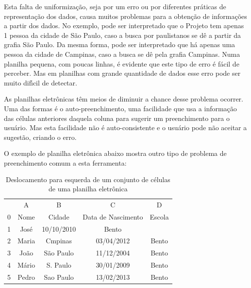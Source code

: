 \documentclass[
12pt,		%
openright,	%
twoside,  %
a4paper,			%
chapter=TITLE,		%
english,			%
french,				%
spanish,			%
brazil				%
]{USPSC-classe/USPSC}
\begin{document}
Esta falta de uniformiza\c{c}\~ao, seja por um erro ou por diferentes pr\'aticas de representa\c{c}\~ao dos dados, causa muitos problemas para a obten\c{c}\~ao de informa\c{c}\~oes a partir dos dados. No exemplo, pode ser interpretado que o Projeto tem apenas 1 pessoa da cidade de S\~ao Paulo, caso a busca por paulistanos se d\^e a partir da grafia \textquotedbl S\~ao Paulo\textquotedbl . Da mesma forma, pode ser interpretado que h\'a apenas uma pessoa da cidade de Campinas, caso a busca se d\^e pela grafia \textquotedbl Campinas\textquotedbl . Numa planilha pequena, com poucas linhas, \'e evidente que este tipo de erro \'e f\'acil de perceber. Mas em planilhas com grande quantidade de dados esse erro pode ser muito dif\'{\i}cil de detectar.














As planilhas eletr\^onicas t\^em meios de diminuir a chance desse problema ocorrer. Uma das formas \'e o auto-preenchimento, uma facilidade que usa a informa\c{c}\~ao das c\'elulas anteriores daquela coluna para sugerir um preenchimento para o usu\'ario. Mas esta facilidade n\~ao \'e auto-consistente e o usu\'ario pode n\~ao aceitar a sugest\~ao, criando o erro.














O exemplo de planilha eletr\^onica abaixo mostra outro tipo de problema de preenchimento comum a esta ferramenta:


















\begin{table}[htb]
\tiny
\caption{\label{f6feaa39313aa0691b7fdadc84175a203e68bf77}Deslocamento para esquerda de um conjunto de c\'elulas de uma planilha eletr\^onica}

\centering
\begin{tabular}{|c|c|c|c|c|}
\hline
  &  A  &  B  &  C  &  D  \\
0 & Nome  &  Cidade  &  Data de Nascimento  &  Escola \\
1 & Jos\'e  &  10/10/2010  &  Bento  &   \\
2 & Maria  &  Cmpinas  &  03/04/2012  &  Bento \\
3 & Jo\~ao  &  S\~ao Paulo  &  11/12/2004  &  Bento \\
4 & M\'ario  &  S. Paulo  &  30/01/2009  &  Bento \\
5 & Pedro  &  Sao Paulo  &  13/02/2013  &  Bento \\
\hline
\end{tabular}
\end{table}
\end{document}
